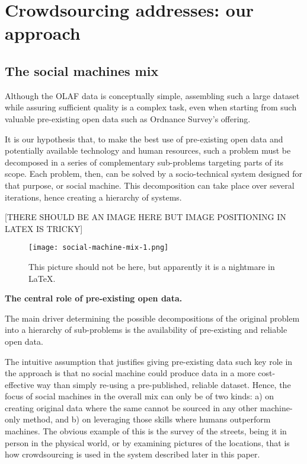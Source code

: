 \section{Crowdsourcing addresses: our approach}

\subsection{The social machines mix}

    Although the OLAF data is conceptually simple, assembling such a large dataset while assuring sufficient quality is a complex task, even when starting from such valuable pre-existing open data such as Ordnance Survey's offering.
    
    It is our hypothesis that, to make the best use of pre-existing open data and potentially available technology and human resources, such a problem must be decomposed in a series of complementary sub-problems targeting parts of its scope. Each problem, then, can be solved by a socio-technical system designed for that purpose, or social machine. This decomposition can take place over several iterations, hence creating a hierarchy of systems. 

    [THERE SHOULD BE AN IMAGE HERE BUT IMAGE POSITIONING IN LATEX IS TRICKY]

    \begin{figure*}
    	\texttt{[image: social-machine-mix-1.png]}
    	\caption{This picture should not be here, but apparently it is a nightmare in LaTeX.}
    	\label{fig:social_machine_mix_1}
    \end{figure*}
    
    \textbf{The central role of pre-existing open data.} 
    
    The main driver determining the possible decompositions of the original problem into a hierarchy of sub-problems is the availability of pre-existing and reliable open data. 
    
    The intuitive assumption that justifies giving pre-existing data such key role in the approach is that no social machine could produce data in a more cost-effective way than simply re-using a pre-published, reliable dataset. Hence, the focus of social machines in the overall mix can only be of two kinds: a) on creating original data where the same cannot be sourced in any other machine-only method, and b) on leveraging those skills where humans outperform machines. The obvious example of this is the survey of the streets, being it in person in the physical world, or by examining pictures of the locations, that is how crowdsourcing is used in the system described later in this paper. 

